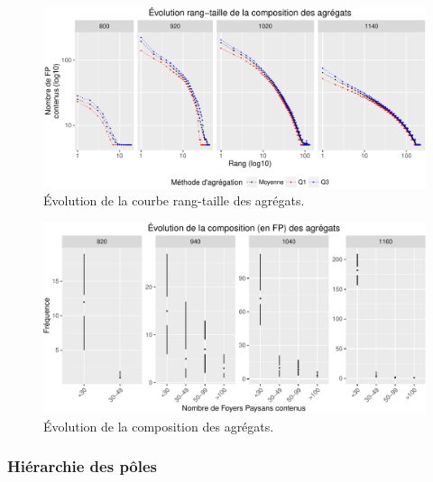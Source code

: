 \begin{figure}[H]
\captionsetup{width=\linewidth}
\includegraphics[width=.8\linewidth]{img/resultats/v0_rt_agregats.pdf}
\caption{Évolution de la courbe rang-taille des agrégats.}
\label{fig:rt-agregats-v0}
\end{figure}

\begin{figure}[H]
\captionsetup{width=\linewidth}
\includegraphics[width=.8\linewidth]{img/resultats/v0_compo_agregats.pdf}
\caption{Évolution de la composition des agrégats.}
\label{fig:compo-agregats-v0}
\end{figure}

\clearpage

\subsubsection{Hiérarchie des pôles}

